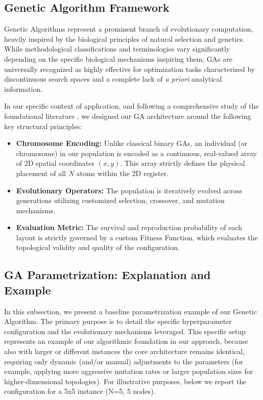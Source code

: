 \subsection{Genetic Algorithm Framework}
Genetic Algorithms represent a prominent branch of evolutionary computation, heavily inspired by the biological principles of natural selection and genetics. While methodological classifications and terminologies vary significantly depending on the specific biological mechanisms inspiring them, GAs are universally recognized as highly effective for optimization tasks characterized by discontinuous search spaces and a complete lack of \textit{a priori} analytical information.

In our specific context of application, and following a comprehensive study of the foundational literature \cite{bookGA}, we designed our GA architecture around the following key structural principles: 

\begin{itemize}
    \item \textbf{Chromosome Encoding:} Unlike classical binary GAs, an individual (or chromosome) in our population is encoded as a continuous, real-valued array of 2D spatial coordinates $(x,y)$. This array strictly defines the physical placement of all $N$ atoms within the 2D register.
    \item \textbf{Evolutionary Operators:} The population is iteratively evolved across generations utilizing customized selection, crossover, and mutation mechanisms.
    \item \textbf{Evaluation Metric:} The survival and reproduction probability of each layout is strictly governed by a custom Fitness Function, which evaluates the topological validity and quality of the configuration.
\end{itemize}

\subsection{GA Parametrization: Explanation and Example}

In this subsection, we present a baseline parametrization example of our Genetic Algorithm. The primary purpose is to detail the specific hyperparameter configuration and the evolutionary mechanisms leveraged. 
This specific setup represents an example of our algorithmic foundation in our approach, because also with larger or different instances the core architecture remains identical, requiring only dynamic (and/or manual) adjustments to the parameters (for example, applying more aggressive mutation rates or larger population sizes for higher-dimensional topologies).
For illustrative purposes, below we report the configuration for a 5x5 instance (N=5, 5 nodes).

